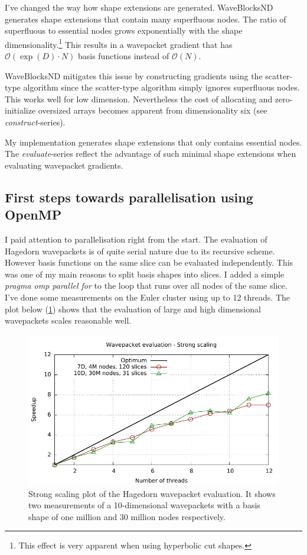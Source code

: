 \documentclass{article}
\begin{document}
I've changed the way how shape extensions are generated. WaveBlocksND generates
shape extensions that contain many superfluous nodes. The ratio of superfluous to
essential nodes grows exponentially with the shape
dimensionality.\footnote{This effect is very apparent when using hyperbolic cut shapes.}
This results in a wavepacket gradient that has \(\mathcal{O}(\exp{}(D)\cdot N)\) basis functions instead of
\(\mathcal{O}(N)\).

WaveBlocksND mitigates this issue by constructing gradients using the scatter-type algorithm
since the scatter-type algorithm simply ignores superfluous nodes. This works well for low dimension.
Nevertheless the cost of allocating and zero-initialize oversized arrays
becomes apparent from dimensionality six (see \emph{construct}-series).

My implementation generates shape extensions that only contains essential nodes.
The \emph{evaluate}-series reflect the advantage of such minimal shape extensions
when evaluating wavepacket gradients.

\subsection{First steps towards parallelisation using OpenMP}

I paid attention to parallelisation right from the start.
The evaluation of Hagedorn wavepackets is of quite serial nature due to its
recursive scheme. However basis functions on the same slice can be evaluated independently.
This was one of my main reasons to split basis shapes into slices.
I added a simple \emph{pragma omp parallel for} to the loop that runs over all nodes
of the same slice. I've done some measurements on the Euler cluster using up to 12 threads.
The plot below (\ref{fig:hawp_eval_omp}) shows that the evaluation of large and high dimensional
wavepackets scales reasonable well.

\begin{figure}[H]
  \centering
  \includegraphics[width=1.0\textwidth]{plots/hawp_eval_omp}
  \caption{
    Strong scaling plot of the Hagedorn wavepacket evaluation.
    It shows two measurements of a 10-dimensional wavepackets
    with a basis shape of one million and 30 million nodes respectively.
  }
  \label{fig:hawp_eval_omp}
\end{figure}
\end{document}
